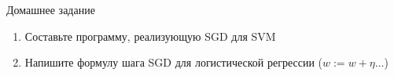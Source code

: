 \documentclass[landscape]{slides}
\begin{document}
\begin{slide}
Домашнее задание
\begin{enumerate}
\item Составьте программу, реализующую SGD для SVM
\item Напишите формулу шага SGD для логистической регрессии ($w:=w+\eta\ldots$)
\end{enumerate}
\end{slide}
\end{document}
